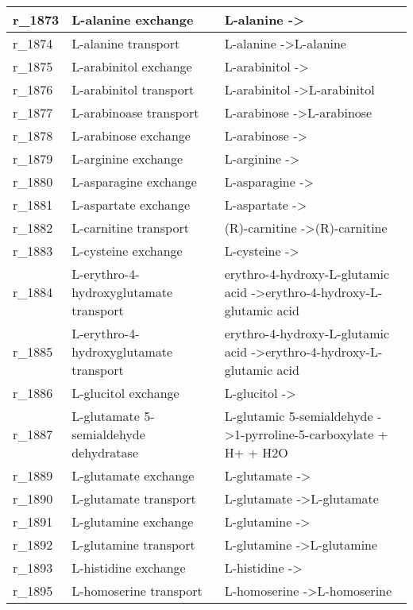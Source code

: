 \begin{landscape}
{\begin{longtable}{|l|p{7cm}|p{15cm}|}
r\_1873 & L-alanine exchange & L-alanine  -\textgreater{} \\ \hline
r\_1874 & L-alanine transport & L-alanine  -\textgreater L-alanine \\ \hline
r\_1875 & L-arabinitol exchange & L-arabinitol  -\textgreater{} \\ \hline
r\_1876 & L-arabinitol transport & L-arabinitol  -\textgreater L-arabinitol \\ \hline
r\_1877 & L-arabinoase transport & L-arabinose  -\textgreater L-arabinose \\ \hline
r\_1878 & L-arabinose exchange & L-arabinose  -\textgreater{} \\ \hline
r\_1879 & L-arginine exchange & L-arginine  -\textgreater{} \\ \hline
r\_1880 & L-asparagine exchange & L-asparagine  -\textgreater{} \\ \hline
r\_1881 & L-aspartate exchange & L-aspartate  -\textgreater{} \\ \hline
r\_1882 & L-carnitine transport & (R)-carnitine  -\textgreater (R)-carnitine \\ \hline
r\_1883 & L-cysteine exchange & L-cysteine  -\textgreater{} \\ \hline
r\_1884 & L-erythro-4-hydroxyglutamate transport & erythro-4-hydroxy-L-glutamic acid  -\textgreater erythro-4-hydroxy-L-glutamic acid \\ \hline
r\_1885 & L-erythro-4-hydroxyglutamate transport & erythro-4-hydroxy-L-glutamic acid  -\textgreater erythro-4-hydroxy-L-glutamic acid \\ \hline
r\_1886 & L-glucitol exchange & L-glucitol  -\textgreater{} \\ \hline
r\_1887 & L-glutamate 5-semialdehyde dehydratase & L-glutamic 5-semialdehyde  -\textgreater 1-pyrroline-5-carboxylate + H+ + H2O \\ \hline
r\_1889 & L-glutamate exchange & L-glutamate  -\textgreater{} \\ \hline
r\_1890 & L-glutamate transport & L-glutamate  -\textgreater L-glutamate \\ \hline
r\_1891 & L-glutamine exchange & L-glutamine  -\textgreater{} \\ \hline
r\_1892 & L-glutamine transport & L-glutamine  -\textgreater L-glutamine \\ \hline
r\_1893 & L-histidine exchange & L-histidine  -\textgreater{} \\ \hline
r\_1895 & L-homoserine transport & L-homoserine  -\textgreater L-homoserine \\ \hline

\end{longtable}}
\end{landscape}
